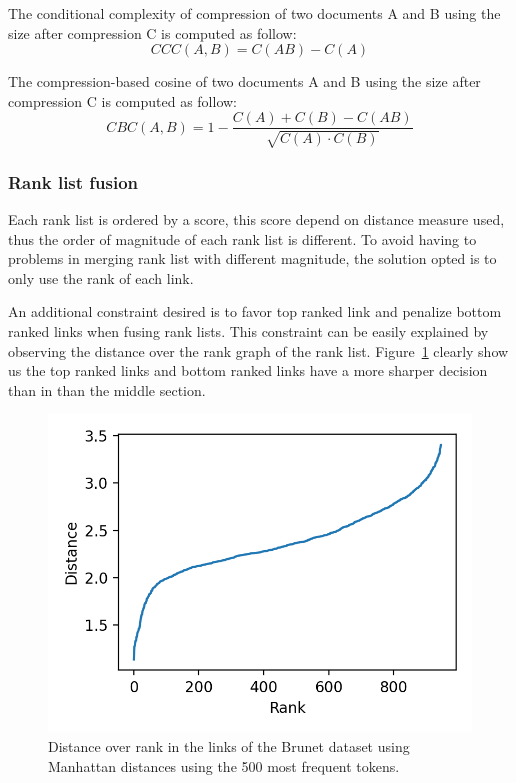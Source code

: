 \begin{definition}
  The conditional complexity of compression of two documents A and B using the size after compression C is computed as follow:
  \begin{equation}
    CCC(A, B) = C(AB) - C(A)
  \end{equation}

\end{definition}

\begin{definition}
  The compression-based cosine of two documents A and B using the size after compression C is computed as follow:
  \begin{equation}
    CBC(A, B) = 1 - \frac{C(A) + C(B) - C(AB)}{\sqrt{C(A) \cdot C(B)}}
  \end{equation}
\end{definition}

\subsubsection{Rank list fusion}

Each rank list is ordered by a score, this score depend on distance measure used, thus the order of magnitude of each rank list is different.
To avoid having to problems in merging rank list with different magnitude, the solution opted is to only use the rank of each link.

An additional constraint desired is to favor top ranked link and penalize bottom ranked links when fusing rank lists.
This constraint can be easily explained by observing the distance over the rank graph of the rank list.
Figure~\ref{fig:distance_over_rank} clearly show us the top ranked links and bottom ranked links have a more sharper decision than in than the middle section.

\begin{figure}
  \includegraphics[width=\linewidth]{img/distance_over_rank.png}
  \caption{Distance over rank in the links of the Brunet dataset using Manhattan distances using the 500 most frequent tokens.}
  \label{fig:distance_over_rank}
\end{figure}

